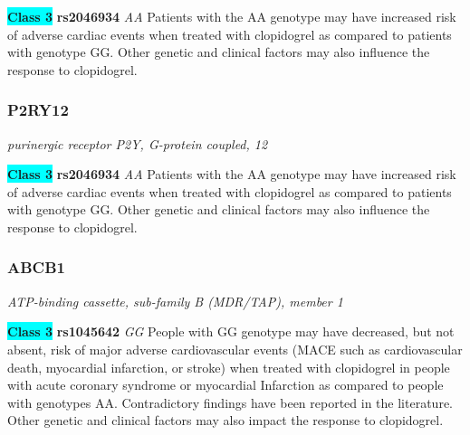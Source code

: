 \documentclass{report}
\begin{document}
\textbf{\colorbox{cyan} {Class 3}} \textbf{ rs2046934 } \textit{ AA }
Patients with the AA genotype may have increased risk of adverse cardiac events when treated with clopidogrel as compared to patients with genotype GG. Other genetic and clinical factors may also influence the response to clopidogrel.\newline\subsubsection{ P2RY12 }
\textit{ purinergic receptor P2Y, G-protein coupled, 12 }

\textbf{\colorbox{cyan} {Class 3}} \textbf{ rs2046934 } \textit{ AA }
Patients with the AA genotype may have increased risk of adverse cardiac events when treated with clopidogrel as compared to patients with genotype GG. Other genetic and clinical factors may also influence the response to clopidogrel.\newline\subsubsection{ ABCB1 }
\textit{ ATP-binding cassette, sub-family B (MDR/TAP), member 1 }

\textbf{\colorbox{cyan} {Class 3}} \textbf{ rs1045642 } \textit{ GG }
People with GG  genotype may have decreased, but not absent, risk of major adverse cardiovascular events (MACE such as cardiovascular death, myocardial infarction, or stroke) when treated with clopidogrel in people with acute coronary syndrome or myocardial Infarction as compared to people with genotypes AA. Contradictory findings have been reported in the literature. Other genetic and clinical factors may also impact the response to clopidogrel.\newline
\end{document}
